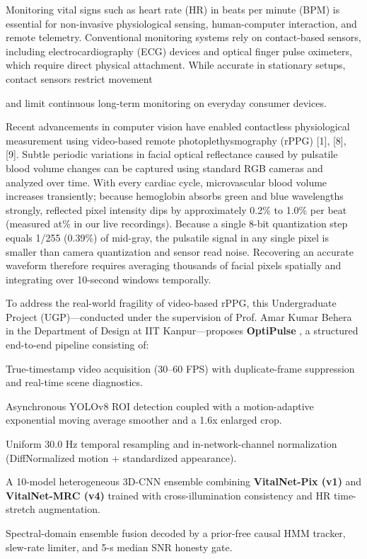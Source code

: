 \documentclass[twocolumn,letterpaper]{article}
\newcommand\headsize{\fontsize{10}{12}\selectfont}
\newcommand\lb{\linebreak[4]\relax}                         %
\newcommand\colbreak{{\parfillskip=0pt\par}\newpage\noindent}  %
\newcommand\Section[1]{%
  \par\vspace{5.4pt}\refstepcounter{section}%
  {\headsize\noindent\makebox[\linewidth][c]{\Roman{section}. #1}\par}%
  \vspace{1.25pt}}
\begin{document}
\vspace{8.0pt}
\Section{INTRODUCTION}
Monitoring vital signs such as heart rate (HR) in beats per\lb
minute (BPM) is essential for non-invasive physiological sensing,\lb
human-computer interaction, and remote telemetry. Conventional\lb
monitoring systems rely on contact-based sensors, including\lb
electrocardiography (ECG) devices and optical finger pulse\lb
oximeters, which require direct physical attachment. While\lb
accurate in stationary setups, contact sensors restrict movement
\colbreak
and limit continuous long-term monitoring on everyday\lb
consumer devices.

Recent advancements in computer vision have enabled\lb
contactless physiological measurement using video-based remote\lb
photoplethysmography (rPPG) [1], [8], [9]. Subtle periodic\lb
variations in facial optical reflectance caused by pulsatile blood\lb
volume changes can be captured using standard RGB cameras\lb
and analyzed over time. With every cardiac cycle, microvascular\lb
blood volume increases transiently; because hemoglobin absorbs\lb
green and blue wavelengths strongly, reflected pixel intensity\lb
dips by approximately 0.2\% to 1.0\% per beat (measured at\lb
0.34\% in our live recordings). Because a single 8-bit quantization\lb
step equals 1/255 (0.39\%) of mid-gray, the pulsatile signal in any\lb
single pixel is smaller than camera quantization and sensor read\lb
noise. Recovering an accurate waveform therefore requires\lb
averaging thousands of facial pixels spatially and integrating\lb
over 10-second windows temporally.

To address the real-world fragility of video-based rPPG, this\lb
Undergraduate Project (UGP)---conducted under the supervision\lb
of Prof. Amar Kumar Behera in the Department of Design at IIT\lb
Kanpur---proposes \textbf{OptiPulse} , a structured end-to-end pipeline\lb
consisting of:
\begin{bul}
\item True-timestamp video acquisition (30--60 FPS) with\lb
duplicate-frame suppression and real-time scene diagnostics.
\item Asynchronous YOLOv8 ROI detection coupled with a\lb
motion-adaptive exponential moving average smoother and a\lb
1.6x enlarged crop.
\item Uniform 30.0 Hz temporal resampling and in-network\lb
6-channel normalization (DiffNormalized motion +\lb
standardized appearance).
\item A 10-model heterogeneous 3D-CNN ensemble combining\lb
\textbf{VitalNet-Pix (v1)} and \textbf{VitalNet-MRC (v4)} trained with\lb
cross-illumination consistency and HR time-stretch\lb
augmentation.
\item Spectral-domain ensemble fusion decoded by a prior-free\lb
causal HMM tracker, slew-rate limiter, and 5-s median SNR\lb
honesty gate.
\end{bul}
\end{document}

